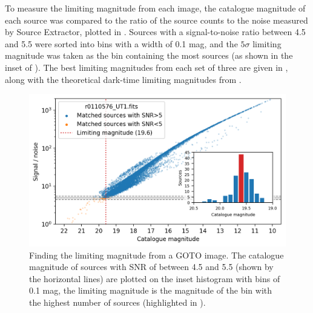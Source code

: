 \begin{colsection}
To measure the limiting magnitude from each image, the catalogue magnitude of each source was compared to the ratio of the source counts to the noise measured by Source Extractor, plotted in . Sources with a signal-to-noise ratio between 4.5 and 5.5 were sorted into bins with a width of 0.1 mag, and the $5\sigma$ limiting magnitude was taken as the bin containing the most sources (as shown in the inset of ). The best limiting magnitudes from each set of three are given in , along with the theoretical dark-time limiting magnitudes from .

\begin{figure}[t]
    \begin{center}
        \includegraphics[width=\linewidth]{images/throughput/limiting_mag_real.png}
    \end{center}
    \caption[Finding the limiting magnitude from a GOTO image]{
        Finding the limiting magnitude from a GOTO image. The catalogue magnitude of sources with SNR of between 4.5 and 5.5 (shown by the  horizontal lines) are plotted on the inset histogram with bins of 0.1 mag, the limiting magnitude is the magnitude of the bin with the highest number of sources (highlighted in ).
    }\label{fig:lim_mag}
\end{figure}

\newpage


\end{colsection}
